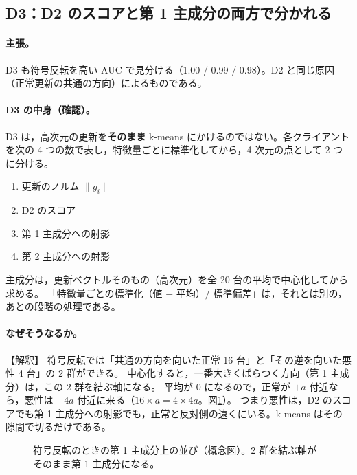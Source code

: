 \documentclass[a4j, dvipdfmx]{jsarticle}  %
\begin{document}
\subsection{D3：D2 のスコアと第 1 主成分の両方で分かれる}
\label{sec:claim-sf-d3}

\paragraph{主張。}
D3 も符号反転を高い AUC で見分ける（1.00 / 0.99 / 0.98）。D2 と同じ原因（正常更新の共通の方向）によるものである。

\paragraph{D3 の中身（確認）。}
D3 は，高次元の更新を\textbf{そのまま} k-means にかけるのではない。各クライアントを次の 4 つの数で表し，特徴量ごとに標準化してから，4 次元の点として 2 つに分ける。
\begin{enumerate}
  \item 更新のノルム $\|g_i\|$
  \item D2 のスコア
  \item 第 1 主成分への射影
  \item 第 2 主成分への射影
\end{enumerate}
主成分は，更新ベクトルそのもの（高次元）を全 20 台の平均で中心化してから求める。
「特徴量ごとの標準化（値 $-$ 平均）$/$ 標準偏差」は，それとは別の，あとの段階の処理である。

\paragraph{なぜそうなるか。}【解釈】
符号反転では「共通の方向を向いた正常 16 台」と「その逆を向いた悪性 4 台」の 2 群ができる。
中心化すると，一番大きくばらつく方向（第 1 主成分）は，この 2 群を結ぶ軸になる。
平均が 0 になるので，正常が $+a$ 付近なら，悪性は $-4a$ 付近に来る（$16 \times a = 4 \times 4a$。図\ref{fig:sf-pc1}）。
つまり悪性は，D2 のスコアでも第 1 主成分への射影でも，正常と反対側の遠くにいる。k-means はその隙間で切るだけである。

\begin{figure}[H]
\centering
{}
\caption{符号反転のときの第 1 主成分上の並び（概念図）。2 群を結ぶ軸がそのまま第 1 主成分になる。}
\label{fig:sf-pc1}
\end{figure}
\end{document}

